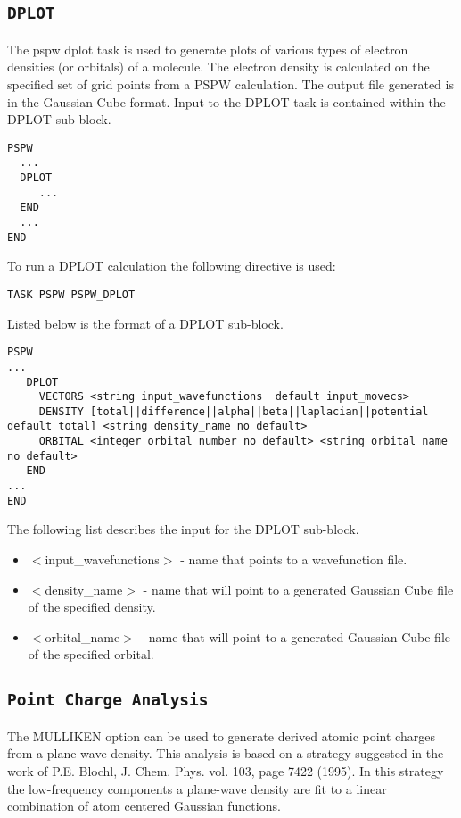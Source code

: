 \subsection{\tt DPLOT}
\label{sec:pspw_dplot}
The pspw dplot task is used to generate plots of various types of electron
densities (or orbitals) of a molecule.  The electron density is calculated on the 
specified set of grid points from a PSPW calculation.  The output file
generated is in the Gaussian Cube format.
Input to the DPLOT task is contained
within the DPLOT sub-block.
\begin{verbatim}
PSPW
  ...
  DPLOT
     ...
  END
  ...
END
\end{verbatim}
To run a DPLOT calculation the following directive 
is used:
\begin{verbatim}
TASK PSPW PSPW_DPLOT
\end{verbatim}
Listed below is the format of a DPLOT sub-block.
\begin{verbatim}
PSPW
... 
   DPLOT
     VECTORS <string input_wavefunctions  default input_movecs>  
     DENSITY [total||difference||alpha||beta||laplacian||potential default total] <string density_name no default>
     ORBITAL <integer orbital_number no default> <string orbital_name no default>
   END
...
END
\end{verbatim}
The following list describes the input for the DPLOT
sub-block.
\begin{itemize}
        \item $<$input\_wavefunctions$>$ - name that points
              to a wavefunction file.
        \item $<$density\_name$>$ - name that will 
              point to a generated Gaussian Cube file of the specified density.
        \item $<$orbital\_name$>$ - name that will 
              point to a generated Gaussian Cube file of the specified orbital.
\end{itemize}


\subsection{\tt Point Charge Analysis}
\label{sec:pspw_point_charge_analysis}

The MULLIKEN option can be used to generate derived atomic point charges
from a plane-wave density.  This analysis is based on a strategy suggested in the work of
P.E. Blochl, J. Chem. Phys. vol. 103, page 7422 (1995).  In this strategy
the low-frequency components a plane-wave density are fit to a linear
combination of atom centered Gaussian functions.

